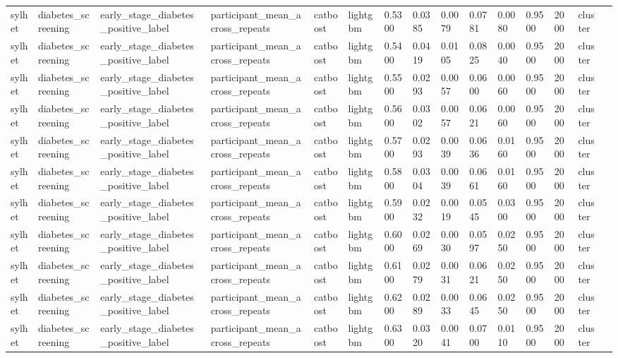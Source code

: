 \begin{tabular}{lllllllllllllll}
sylhet & diabetes\_screening & early\_stage\_diabetes\_positive\_label & participant\_mean\_across\_repeats & catboost & lightgbm & 0.5300 & 0.0385 & 0.0079 & 0.0781 & 0.0080 & 0.9500 & 2000 & cluster &  \\
sylhet & diabetes\_screening & early\_stage\_diabetes\_positive\_label & participant\_mean\_across\_repeats & catboost & lightgbm & 0.5400 & 0.0419 & 0.0105 & 0.0825 & 0.0040 & 0.9500 & 2000 & cluster &  \\
sylhet & diabetes\_screening & early\_stage\_diabetes\_positive\_label & participant\_mean\_across\_repeats & catboost & lightgbm & 0.5500 & 0.0293 & 0.0057 & 0.0600 & 0.0060 & 0.9500 & 2000 & cluster &  \\
sylhet & diabetes\_screening & early\_stage\_diabetes\_positive\_label & participant\_mean\_across\_repeats & catboost & lightgbm & 0.5600 & 0.0302 & 0.0057 & 0.0621 & 0.0060 & 0.9500 & 2000 & cluster &  \\
sylhet & diabetes\_screening & early\_stage\_diabetes\_positive\_label & participant\_mean\_across\_repeats & catboost & lightgbm & 0.5700 & 0.0293 & 0.0039 & 0.0636 & 0.0160 & 0.9500 & 2000 & cluster &  \\
sylhet & diabetes\_screening & early\_stage\_diabetes\_positive\_label & participant\_mean\_across\_repeats & catboost & lightgbm & 0.5800 & 0.0304 & 0.0039 & 0.0661 & 0.0160 & 0.9500 & 2000 & cluster &  \\
sylhet & diabetes\_screening & early\_stage\_diabetes\_positive\_label & participant\_mean\_across\_repeats & catboost & lightgbm & 0.5900 & 0.0232 & 0.0019 & 0.0545 & 0.0300 & 0.9500 & 2000 & cluster &  \\
sylhet & diabetes\_screening & early\_stage\_diabetes\_positive\_label & participant\_mean\_across\_repeats & catboost & lightgbm & 0.6000 & 0.0269 & 0.0030 & 0.0597 & 0.0250 & 0.9500 & 2000 & cluster &  \\
sylhet & diabetes\_screening & early\_stage\_diabetes\_positive\_label & participant\_mean\_across\_repeats & catboost & lightgbm & 0.6100 & 0.0279 & 0.0031 & 0.0621 & 0.0250 & 0.9500 & 2000 & cluster &  \\
sylhet & diabetes\_screening & early\_stage\_diabetes\_positive\_label & participant\_mean\_across\_repeats & catboost & lightgbm & 0.6200 & 0.0289 & 0.0033 & 0.0645 & 0.0250 & 0.9500 & 2000 & cluster &  \\
sylhet & diabetes\_screening & early\_stage\_diabetes\_positive\_label & participant\_mean\_across\_repeats & catboost & lightgbm & 0.6300 & 0.0320 & 0.0041 & 0.0700 & 0.0110 & 0.9500 & 2000 & cluster &  \\

\end{tabular}
